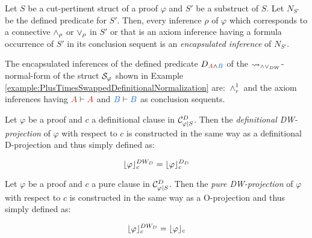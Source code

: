 \begin{definition}
\label{definition:EncapsulatedInferences}
Let $S$ be a cut-pertinent struct of a proof $\varphi$ and $S'$ be a substruct of $S$. Let $N_{S'}$ be the defined predicate for $S'$. Then, every inference $\rho$ of $\varphi$ which corresponds to a connective $\wedge_{\rho}$ or $\vee_{\rho}$ in $S'$ or that is an axiom inference having a formula occurrence of $S'$ in its conclusion sequent is an \emph{encapsulated inference} of $N_{S'}$.
\end{definition}

\begin{example}
\label{example:EncapsulatedInferences}


The encapsulated inferences of the defined predicate $D_{\hA{A} \structplus \hB{B}}$ of the $\leadsto_{\wedge\vee_{DW}}$-normal-form of the struct $\mathcal{S}_{\varphi}$ shown in Example \ref{example:PlusTimesSwappedDefinitionalNormalization} are: $\wedge^1_r$ and the axiom inferences having $\hA{A} \seq \hA{A}$ and $\hB{B} \seq \hB{B}$ as conclusion sequents.
\end{example}


\begin{definition}
\label{definition:DWProjectionDefinitional}
Let $\varphi$ be a proof and $c$ a definitional clause in $\mathcal{C}^{D}_{\varphi|S}$. Then the \emph{definitional DW-projection} of $\varphi$ with respect to $c$ is constructed in the same way as a definitional D-projection and thus simply defined as:

$$
\lfloor \varphi \rfloor_{c}^{DW_D} = \lfloor \varphi \rfloor_{c}^{D_D}
$$
\end{definition}


\begin{definition}
\label{definition:DWProjectionPure}
Let $\varphi$ be a proof and $c$ a pure clause in $\mathcal{C}^{D}_{\varphi|S}$. Then the \emph{pure DW-projection} of $\varphi$ with respect to $c$ is constructed in the same way as a O-projection and thus simply defined as:

$$
\lfloor \varphi \rfloor_{c}^{DW_D} = \lfloor \varphi \rfloor_{c}
$$
\end{definition}


